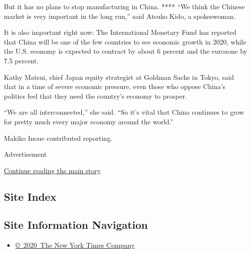 But it has no plans to stop manufacturing in China. **** ``We think the
Chinese market is very important in the long run,'' said Atsuko Kido, a
spokeswoman.

It is also important right now: The International Monetary Fund has
reported that China will be one of the few countries to see economic
growth in 2020, while the U.S. economy is expected to contract by about
6 percent and the eurozone by 7.5 percent.

Kathy Matsui, chief Japan equity strategist at Goldman Sachs in Tokyo,
said that in a time of severe economic pressure, even those who oppose
China's politics feel that they need the country's economy to prosper.

``We are all interconnected,'' she said. ``So it's vital that China
continues to grow for pretty much every major economy around the
world.''

Makiko Inoue contributed reporting.

Advertisement

\protect\hyperlink{after-bottom}{Continue reading the main story}

\hypertarget{site-index}{%
\subsection{Site Index}\label{site-index}}

\hypertarget{site-information-navigation}{%
\subsection{Site Information
Navigation}\label{site-information-navigation}}

\begin{itemize}
\tightlist
\item
  \href{https://help.nytimes.com/hc/en-us/articles/115014792127-Copyright-notice}{©~2020~The
  New York Times Company}
\end{itemize}

